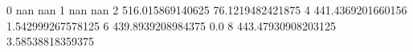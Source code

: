 0 nan nan
1 nan nan
2 516.015869140625 76.1219482421875
4 441.4369201660156 1.542999267578125
6 439.8939208984375 0.0
8 443.47930908203125 3.58538818359375
